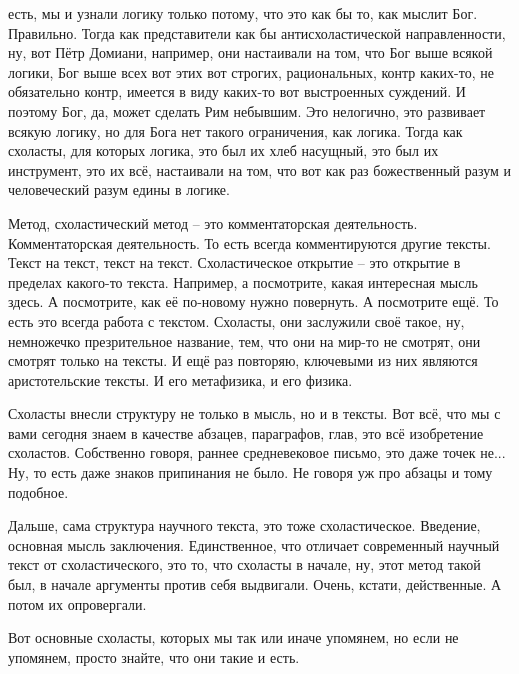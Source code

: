есть, мы и узнали логику только потому, что это как бы то, как мыслит Бог.
Правильно. Тогда как представители как бы антисхоластической направленности, ну,
вот Пётр Домиани, например, они настаивали на том, что Бог выше всякой логики,
Бог выше всех вот этих вот строгих, рациональных, контр каких-то, не обязательно
контр, имеется в виду каких-то вот выстроенных суждений. И поэтому Бог, да,
может сделать Рим небывшим. Это нелогично, это развивает всякую логику, но для
Бога нет такого ограничения, как логика. Тогда как схоласты, для которых логика,
это был их хлеб насущный, это был их инструмент, это их всё, настаивали на том,
что вот как раз божественный разум и человеческий разум едины в логике. 

Метод, схоластический
метод – это комментаторская деятельность. Комментаторская деятельность. То есть
всегда комментируются другие тексты. Текст на текст, текст на текст.
Схоластическое открытие – это открытие в пределах какого-то текста. Например, а
посмотрите, какая интересная мысль здесь. А посмотрите, как её по-новому нужно
повернуть. А посмотрите ещё. То есть это всегда работа с текстом. Схоласты, они
заслужили своё такое, ну, немножечко презрительное название, тем, что они на
мир-то не смотрят, они смотрят только на тексты. И ещё раз повторяю, ключевыми
из них являются аристотельские тексты. И его метафизика, и его физика. 

Схоласты внесли структуру не только в мысль, но и в тексты. Вот
всё, что мы с вами сегодня знаем в качестве абзацев, параграфов, глав, это всё
изобретение схоластов. Собственно говоря, раннее средневековое письмо, это даже
точек не... Ну, то есть даже знаков припинания не было. Не говоря уж про абзацы
и тому подобное.

Дальше, сама структура научного текста, это тоже
схоластическое. Введение, основная мысль заключения. Единственное, что отличает
современный научный текст от схоластического, это то, что схоласты в начале, ну,
этот метод такой был, в начале аргументы против себя выдвигали. Очень, кстати,
действенные. А потом их опровергали.

Вот основные схоласты, которых мы так или иначе
упомянем, но если не упомянем, просто знайте, что они такие и есть. 

